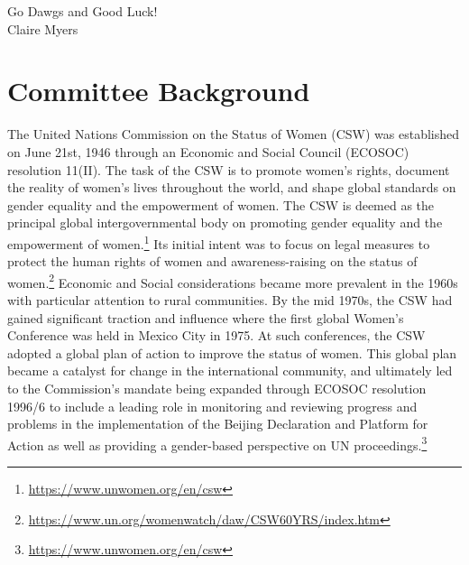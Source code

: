 \documentclass[10pt, letterpaper]{article}
\begin{document}
Go Dawgs and Good Luck! \\

Claire Myers

\newpage
\tableofcontents
\newpage
\section{Committee Background}

The United Nations Commission on the Status of Women (CSW) was
established on June 21st, 1946 through an Economic and Social Council
(ECOSOC) resolution 11(II). The task of the CSW is to promote women's
rights, document the reality of women's lives throughout the world, and
shape global standards on gender equality and the empowerment of women.
The CSW is deemed as the principal global intergovernmental body on
promoting gender equality and the empowerment of women.\footnote{\href{https://www.unwomen.org/en/csw}{{https://www.unwomen.org/en/csw}}} 
Its initial intent was to focus on legal measures to protect the human
rights of women and awareness-raising on the status of women.\footnote{\href{https://www.un.org/womenwatch/daw/CSW60YRS/index.htm}{{https://www.un.org/womenwatch/daw/CSW60YRS/index.htm}}}
Economic and Social considerations became more prevalent in the 1960s
with particular attention to rural communities. By the mid 1970s, the
CSW had gained significant traction and influence where the first global
Women's Conference was held in Mexico City in 1975. At such conferences,
the CSW adopted a global plan of action to improve the status of women.
This global plan became a catalyst for change in the international
community, and ultimately led to the Commission's mandate being expanded
through ECOSOC resolution 1996/6 to include a leading role in monitoring
and reviewing progress and problems in the implementation of the Beijing
Declaration and Platform for Action as well as providing a gender-based
perspective on UN proceedings.\footnote{\href{https://www.unwomen.org/en/csw}{{https://www.unwomen.org/en/csw}}} \\
\end{document}
